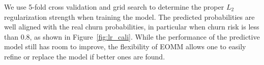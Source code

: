 
We use 5-fold cross validation and grid search to determine the proper $L_2$ regularization strength when training the model. The predicted probabilities are well aligned with the real churn probabilities, in particular when churn risk is less than 0.8, as shown in Figure~\ref{fig:lr_cali}. While the performance of the predictive model still has room to improve, the flexibility of EOMM allows one to easily refine or replace the model if better ones are found.




%


